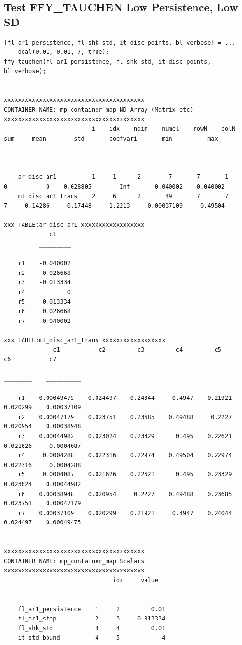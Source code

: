\documentclass[
]{book}
\begin{document}
\hypertarget{test-ffy_tauchen-low-persistence-low-sd}{%
\subsection{Test FFY\_TAUCHEN Low Persistence, Low SD}\label{test-ffy_tauchen-low-persistence-low-sd}}

\begin{verbatim}
[fl_ar1_persistence, fl_shk_std, it_disc_points, bl_verbose] = ...
    deal(0.01, 0.01, 7, true);
ffy_tauchen(fl_ar1_persistence, fl_shk_std, it_disc_points, bl_verbose);

----------------------------------------
xxxxxxxxxxxxxxxxxxxxxxxxxxxxxxxxxxxxxxxx
CONTAINER NAME: mp_container_map ND Array (Matrix etc)
xxxxxxxxxxxxxxxxxxxxxxxxxxxxxxxxxxxxxxxx
                         i    idx    ndim    numel    rowN    colN    sum     mean        std       coefvari       min          max   
                         _    ___    ____    _____    ____    ____    ___    _______    ________    ________    __________    ________

    ar_disc_ar1          1     1      2        7       7       1       0           0    0.028805        Inf      -0.040002    0.040002
    mt_disc_ar1_trans    2     6      2       49       7       7       7     0.14286     0.17448     1.2213     0.00037109     0.49504

xxx TABLE:ar_disc_ar1 xxxxxxxxxxxxxxxxxx
             c1    
          _________

    r1    -0.040002
    r2    -0.026668
    r3    -0.013334
    r4            0
    r5     0.013334
    r6     0.026668
    r7     0.040002

xxx TABLE:mt_disc_ar1_trans xxxxxxxxxxxxxxxxxx
              c1           c2         c3         c4         c5          c6           c7    
          __________    ________    _______    _______    _______    ________    __________

    r1    0.00049475    0.024497    0.24044     0.4947    0.21921    0.020299    0.00037109
    r2    0.00047179    0.023751    0.23685    0.49488     0.2227    0.020954    0.00038948
    r3    0.00044982    0.023024    0.23329      0.495    0.22621    0.021626     0.0004087
    r4     0.0004288    0.022316    0.22974    0.49504    0.22974    0.022316     0.0004288
    r5     0.0004087    0.021626    0.22621      0.495    0.23329    0.023024    0.00044982
    r6    0.00038948    0.020954     0.2227    0.49488    0.23685    0.023751    0.00047179
    r7    0.00037109    0.020299    0.21921     0.4947    0.24044    0.024497    0.00049475

----------------------------------------
xxxxxxxxxxxxxxxxxxxxxxxxxxxxxxxxxxxxxxxx
CONTAINER NAME: mp_container_map Scalars
xxxxxxxxxxxxxxxxxxxxxxxxxxxxxxxxxxxxxxxx
                          i    idx     value  
                          _    ___    ________

    fl_ar1_persistence    1     2         0.01
    fl_ar1_step           2     3     0.013334
    fl_shk_std            3     4         0.01
    it_std_bound          4     5            4
\end{verbatim}
\end{document}
